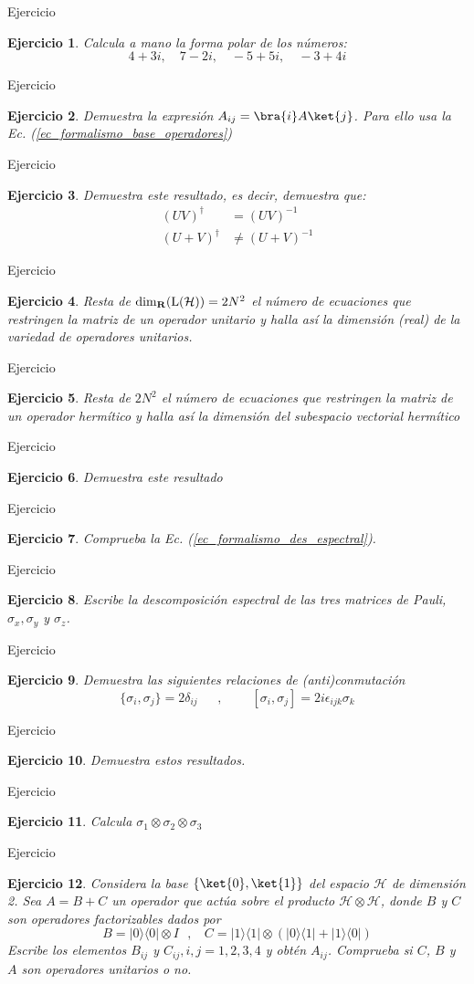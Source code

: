 \documentclass[a4paper,11pt]{book} %
\newtheorem{ejercicio_contador}{Ejercicio}
\newcommand{\Ejercicio}[1]{
		\begin{mybox_gray}{Ejercicio} 
			\begin{ejercicio_contador}
				 #1 
			\end{ejercicio_contador} 
		\end{mybox_gray}
	}
\numberwithin{equation}{chapter}
\newcommand{\ketbra}[2]{| #1\rangle \! \langle #2|}
\begin{document}
\Ejercicio{
Calcula a mano la forma polar de los números:
\begin{equation}
4 + 3i, \quad 7 - 2i, \quad - 5 + 5i, \quad - 3 + 4i
\end{equation}
}

\Ejercicio{
Demuestra la expresión $A_{ij} = \bra{i} A \ket{j}$. Para ello usa la Ec. (\ref{ec_formalismo_base_operadores})
}

\Ejercicio{
Demuestra este resultado, es decir, demuestra que:
\begin{align*}
(UV)^\dagger & = (UV)^{-1} \\
(U+V)^\dagger & \neq (U+V)^{-1}
\end{align*}
}

\Ejercicio{
Resta de ${\rm dim}_{\bf R}({\rm L}(\mathcal{H})) =  2N^2$ el número de ecuaciones que restringen la matriz de un operador unitario y halla así la dimensión (real) de la \textit{variedad de operadores unitarios}.
}

\Ejercicio{
Resta de $2N^2$ el número de ecuaciones que restringen la matriz de un operador hermítico y halla así la dimensión del \textit{subespacio vectorial hermítico}
}

\Ejercicio{
Demuestra este resultado
}

\Ejercicio{
Comprueba la Ec. (\ref{ec_formalismo_des_espectral}).
}

\Ejercicio{
Escribe la descomposición espectral de las tres matrices de Pauli, $\sigma_x, \sigma_y $ y $\sigma_z$.
}

\Ejercicio{
Demuestra las siguientes relaciones de (anti)conmutación
\begin{equation}
\{\sigma_i,\sigma_j \} = 2\delta_{ij}~~~~~~~,~~~~~~~
~~~[\sigma_i,\sigma_j] = 2i\epsilon_{ijk}\sigma_k
\end{equation}
}

\Ejercicio{
Demuestra estos resultados.
}

\Ejercicio{
Calcula $\sigma_1\otimes \sigma_2\otimes \sigma_3$
}

\Ejercicio{
Considera la base $\{\ket{0},\ket{1} \}$ del espacio $\mathcal{H}$ de dimensión 2. Sea $A= B + C$ un operador que actúa sobre el producto $\mathcal{H}\otimes \mathcal{H}$,  donde $B$ y $C$ son operadores factorizables dados por
\begin{equation}
B = \ketbra{0}{0}\otimes I ~~~, ~~~~
C = \ketbra{1}{1}\otimes (\ketbra{0}{1} + \ketbra{1}{0})
\end{equation}
Escribe los elementos $B_{ij}$ y $C_{ij}, i,j=1,2,3,4$  y obtén $A_{ij}$. Comprueba si $C$, $B$ y $A$ son operadores unitarios o no.
}
\end{document}
